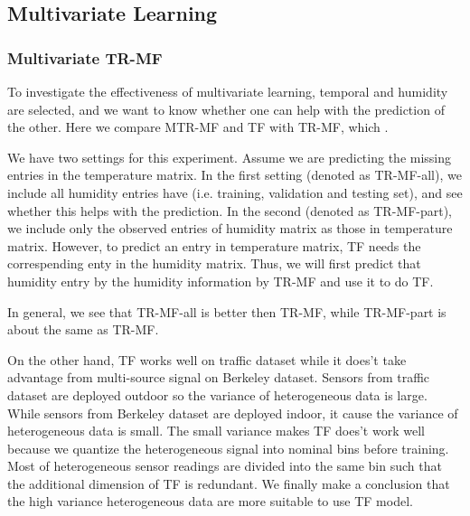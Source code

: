 \subsection{Multivariate Learning}
\subsubsection{Multivariate TR-MF}

To investigate the effectiveness of multivariate learning, temporal and humidity are selected, and we want to know whether one can help with the prediction of the other. Here we compare MTR-MF and TF with TR-MF, which .

We have two settings for this experiment. Assume we are predicting the missing entries in the temperature matrix. In the first setting (denoted as TR-MF-all), we include all humidity entries have (i.e. training, validation and testing set), and see whether this helps with the prediction. In the second (denoted as TR-MF-part), we include only the observed entries of humidity matrix as those in temperature matrix. However, to predict an entry in temperature matrix, TF needs the correspending enty in the humidity matrix. Thus, we will first predict that humidity entry by the humidity information by TR-MF and use it to do TF.

In general, we see that TR-MF-all is better then TR-MF, while TR-MF-part is about the same as TR-MF. 

On the other hand, TF works well on traffic dataset while it does't take advantage from multi-source signal on Berkeley dataset.
Sensors from traffic dataset are deployed outdoor so the variance of heterogeneous data is large.
While sensors from Berkeley dataset are deployed indoor, it cause the variance of heterogeneous data is small.
The small variance makes TF does't work well because we quantize the heterogeneous signal into nominal bins before training.
Most of heterogeneous sensor readings are divided into the same bin such that the additional dimension of TF is redundant.
We finally make a conclusion that the high variance heterogeneous data are more suitable to use TF model.


